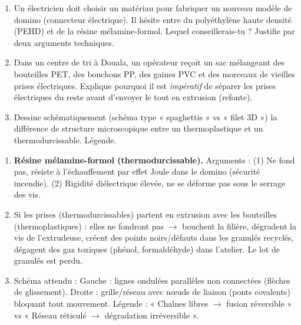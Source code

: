 \documentclass[11pt]{article}
\begin{document}
\begin{exercice}
\begin{enumerate}
    \item Un électricien doit choisir un matériau pour fabriquer un nouveau modèle de domino (connecteur électrique). Il hésite entre du polyéthylène haute densité (PEHD) et de la résine mélamine-formol. Lequel conseillerais-tu ? Justifie par deux arguments techniques.
    \item Dans un centre de tri à Douala, un opérateur reçoit un sac mélangeant des bouteilles PET, des bouchons PP, des gaines PVC et des morceaux de vieilles prises électriques. Explique pourquoi il est \emph{impératif} de séparer les prises électriques du reste avant d'envoyer le tout en extrusion (refonte).
    \item Dessine schématiquement (schéma type « spaghettis » vs « filet 3D ») la différence de structure microscopique entre un thermoplastique et un thermodurcissable. Légende.
\end{enumerate}
\end{exercice}

\begin{corrige}[Exercice n°17]
\begin{enumerate}
    \item \textbf{Résine mélamine-formol (thermodurcissable).} Arguments : (1) Ne fond pas, résiste à l'échauffement par effet Joule dans le domino (sécurité incendie). (2) Rigidité diélectrique élevée, ne se déforme pas sous le serrage des vis.
    \item Si les prises (thermodurcissables) partent en extrusion avec les bouteilles (thermoplastiques) : elles ne fondront pas $\rightarrow$ bouchent la filière, dégradent la vis de l'extrudeuse, créent des points noirs/défauts dans les granulés recyclés, dégagent des gaz toxiques (phénol, formaldéhyde) dans l'atelier. Le lot de granulés est perdu.
    \item Schéma attendu : Gauche : lignes ondulées parallèles non connectées (flèches de glissement). Droite : grille/réseau avec nœuds de liaison (ponts covalents) bloquant tout mouvement. Légende : « Chaînes libres $\rightarrow$ fusion réversible » vs « Réseau réticulé $\rightarrow$ dégradation irréversible ».
\end{enumerate}
\end{corrige}
\end{document}
